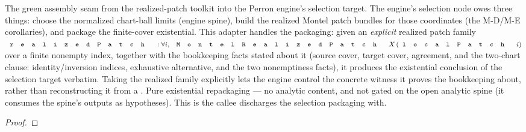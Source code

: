 \begin{lemma}
\label{lem:montel-realized-patch-cover-packaging}
The green assembly seam from the realized-patch toolkit into the Perron engine's
selection target. The engine's selection node
owes three things: choose the normalized chart-ball limits (engine spine), build
the realized Montel patch bundles for those coordinates (the M-D/M-E corollaries),
and package the finite-cover existential. This adapter handles the packaging:
given an \emph{explicit} realized patch family
\(\code{realizedPatch}:\forall i,\ \code{MontelRealizedPatch}\,X\,(\code{localPatch}\,i)\)
over a finite nonempty index, together with the bookkeeping facts stated about it
(source cover, target cover,  agreement, and the two-chart
clause: identity/inversion indices, exhaustive alternative, and the two
 nonemptiness facts), it produces the existential
conclusion of the selection target verbatim. Taking the realized family
explicitly lets the engine control the concrete witness it proves the bookkeeping
about, rather than reconstructing it from a . Pure existential
repackaging --- no analytic content, and not gated on the open analytic spine
(it consumes the spine's outputs as hypotheses). This is the callee
 discharges the selection packaging
with.
\leanok
\end{lemma}
\begin{proof}\leanok\end{proof}

